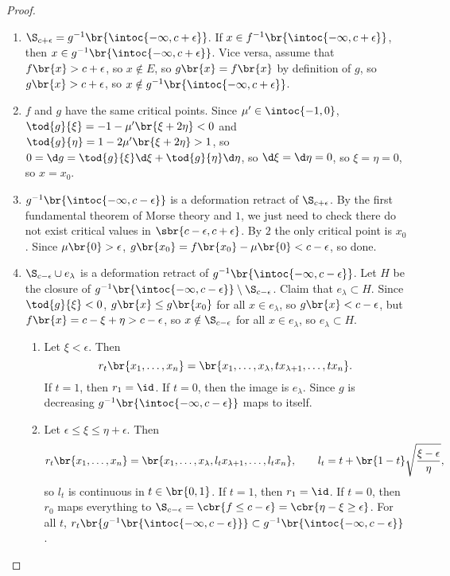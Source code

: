 \begin{proof}

\begin{enumerate}
\item $ \S_{c + \epsilon} = g^{-1}\br{\intoc{-\infty, c + \epsilon}} $. If $ x \in f^{-1}\br{\intoc{-\infty, c + \epsilon}} $, then $ x \in g^{-1}\br{\intoc{-\infty, c + \epsilon}} $. Vice versa, assume that $ f\br{x} > c + \epsilon $, so $ x \notin E $, so $ g\br{x} = f\br{x} $ by definition of $ g $, so $ g\br{x} > c + \epsilon $, so $ x \notin g^{-1}\br{\intoc{-\infty, c + \epsilon}} $.
\item $ f $ and $ g $ have the same critical points. Since $ \mu' \in \intoc{-1, 0} $, $ \tod{g}{\xi} = -1 - \mu'\br{\xi + 2\eta} < 0 $ and $ \tod{g}{\eta} = 1 - 2\mu'\br{\xi + 2\eta} > 1 $, so $ 0 = \d g = \tod{g}{\xi}\d\xi + \tod{g}{\eta}\d\eta $, so $ \d\xi = \d\eta = 0 $, so $ \xi = \eta = 0 $, so $ x = x_0 $.
\item $ g^{-1}\br{\intoc{-\infty, c - \epsilon}} $ is a deformation retract of $ \S_{c + \epsilon} $. By the first fundamental theorem of Morse theory and $ 1 $, we just need to check there do not exist critical values in $ \sbr{c - \epsilon, c + \epsilon} $. By $ 2 $ the only critical point is $ x_0 $. Since $ \mu\br{0} > \epsilon $, $ g\br{x_0} = f\br{x_0} - \mu\br{0} < c - \epsilon $, so done.
\item $ \S_{c - \epsilon} \cup e_\lambda $ is a deformation retract of $ g^{-1}\br{\intoc{-\infty, c - \epsilon}} $. Let $ H $ be the closure of $ g^{-1}\br{\intoc{-\infty, c - \epsilon}} \setminus \S_{c - \epsilon} $. Claim that $ e_\lambda \subset H $. Since $ \tod{g}{\xi} < 0 $, $ g\br{x} \le g\br{x_0} $ for all $ x \in e_\lambda $, so $ g\br{x} < c - \epsilon $, but $ f\br{x} = c - \xi + \eta > c - \epsilon $, so $ x \notin \S_{c - \epsilon} $ for all $ x \in e_\lambda $, so $ e_\lambda \subset H $.
\begin{enumerate}[leftmargin=0.5in, label=Case \arabic*.]
\item Let $ \xi < \epsilon $. Then
$$ r_t\br{x_1, \dots, x_n} = \br{x_1, \dots, x_\lambda, tx_{\lambda + 1}, \dots, tx_n}. $$
If $ t = 1 $, then $ r_1 = \id $. If $ t = 0 $, then the image is $ e_\lambda $. Since $ g $ is decreasing $ g^{-1}\br{\intoc{-\infty, c - \epsilon}} $ maps to itself.
\item Let $ \epsilon \le \xi \le \eta + \epsilon $. Then
$$ r_t\br{x_1, \dots, x_n} = \br{x_1, \dots, x_\lambda, l_tx_{\lambda + 1}, \dots, l_tx_n}, \qquad l_t = t + \br{1 - t}\sqrt{\dfrac{\xi - \epsilon}{\eta}}, $$
so $ l_t $ is continuous in $ t \in \br{0, 1} $. If $ t = 1 $, then $ r_1 = \id $. If $ t = 0 $, then $ r_0 $ maps everything to $ \S_{c - \epsilon} = \cbr{f \le c - \epsilon} = \cbr{\eta - \xi \ge \epsilon} $. For all $ t $, $ r_t\br{g^{-1}\br{\intoc{-\infty, c - \epsilon}}} \subset g^{-1}\br{\intoc{-\infty, c - \epsilon}} $.

\end{enumerate}
\end{enumerate}
\end{proof}
